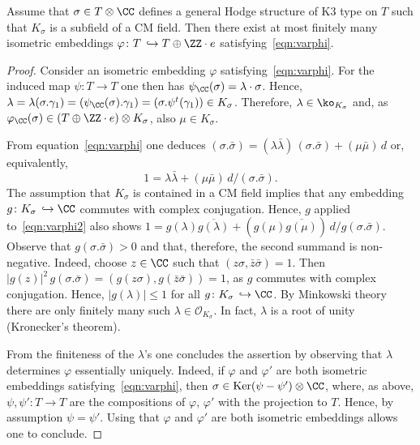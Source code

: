 \begin{lemm}\label{lem:CMlambda}
Assume that $\sigma\in T\otimes\CC$ defines a general Hodge structure of K3 type on $T$ such that $K_\sigma$ is a subfield of a CM field. Then there exist at most finitely many isometric embeddings $\varphi\colon T\,\hookrightarrow T\oplus\ZZ\cdot e$ satisfying~\eqref{eqn:varphi}.
\end{lemm}

\begin{proof}
Consider an isometric embedding $\varphi$ satisfying~\eqref{eqn:varphi}. For the induced map $\psi\colon T\to T$ one then has $\psi_\CC(\sigma)=\lambda\cdot \sigma$. Hence, $\lambda=\lambda(\sigma.\gamma_1)=(\psi_\CC(\sigma).\gamma_1)=(\sigma.\psi^t(\gamma_1))\in K_\sigma$. Therefore, $\lambda\in\ko_{K_\sigma}$ and, as $\varphi_\CC(\sigma)\in (T\oplus\ZZ\cdot e)\otimes K_\sigma$, also $\mu\in K_\sigma$.


From equation~\eqref{eqn:varphi} one deduces $(\sigma.\bar\sigma)=(\lambda\bar\lambda)\,(\sigma.\bar\sigma)+(\mu\bar\mu)\, d$ or, equivalently,
\begin{equation}\label{eqn:varphi2}
1=\lambda\bar\lambda+(\mu\bar\mu)\, d/(\sigma.\bar\sigma).
\end{equation}
The assumption that $K_\sigma$ is contained in a CM field implies that any embedding $g\colon K_\sigma\,\hookrightarrow \CC$ commutes with complex conjugation. Hence, $g$ applied to~\eqref{eqn:varphi2} also shows $1=g(\lambda)\overline{g(\lambda)}+(g(\mu)\overline{g(\mu)})\, d /g(\sigma.\bar\sigma)$. Observe that $g(\sigma.\bar\sigma)>0$ and that, therefore, the second summand is non-negative. Indeed, choose $z\in \CC$ such that $(z\sigma,\bar z\bar\sigma)=1$. Then $|g(z)|^2\,g(\sigma.\bar\sigma)=(g(z\sigma),g(\bar z\bar \sigma))=1$, as $g$ commutes with complex conjugation. Hence, $|g(\lambda)|\leq 1$ for all $g\colon K_\sigma\,\hookrightarrow\CC$. By Minkowski theory there are only finitely many such $\lambda\in{\mathcal O}_{K_\sigma}$. In fact, $\lambda$ is a root of unity (Kronecker's theorem).

From the finiteness of the $\lambda$'s one concludes the assertion by observing that $\lambda$ determines $\varphi$ essentially uniquely. Indeed, if $\varphi$ and $\varphi'$ are both isometric embeddings satisfying~\eqref{eqn:varphi}, then $\sigma\in{\rm Ker}(\psi-\psi')\otimes\CC$, where, as above, $\psi,\psi'\colon T\to T$ are the compositions of $\varphi$, $\varphi'$ with the projection to $T$. Hence, by assumption $\psi=\psi'$. Using that $\varphi$ and $\varphi'$ are both isometric embeddings allows one to conclude.
\end{proof}

